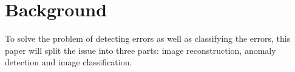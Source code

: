\section{Background}

To solve the problem of detecting errors as well as classifying the errors, this paper will split the issue into three parts: image reconstruction, anomaly detection and image classification. 






